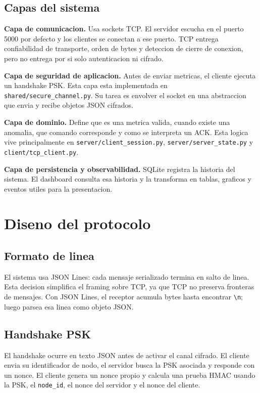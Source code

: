 \documentclass[11pt,letterpaper]{article}
\begin{document}
\subsection{Capas del sistema}

\textbf{Capa de comunicacion.} Usa sockets TCP. El servidor escucha en el puerto
5000 por defecto y los clientes se conectan a ese puerto. TCP entrega
confiabilidad de transporte, orden de bytes y deteccion de cierre de conexion,
pero no entrega por si solo autenticacion ni cifrado.

\textbf{Capa de seguridad de aplicacion.} Antes de enviar metricas, el cliente
ejecuta un handshake PSK. Esta capa esta implementada en
\texttt{shared/secure\_channel.py}. Su tarea es envolver el socket en una
abstraccion que envia y recibe objetos JSON cifrados.

\textbf{Capa de dominio.} Define que es una metrica valida, cuando existe una
anomalia, que comando corresponde y como se interpreta un ACK. Esta logica vive
principalmente en \texttt{server/client\_session.py},
\texttt{server/server\_state.py} y \texttt{client/tcp\_client.py}.

\textbf{Capa de persistencia y observabilidad.} SQLite registra la historia del
sistema. El dashboard consulta esa historia y la transforma en tablas, graficos y
eventos utiles para la presentacion.

\newpage
\section{Diseno del protocolo}

\subsection{Formato de linea}

El sistema usa JSON Lines: cada mensaje serializado termina en salto de linea.
Esta decision simplifica el framing sobre TCP, ya que TCP no preserva fronteras
de mensajes. Con JSON Lines, el receptor acumula bytes hasta encontrar
\texttt{\textbackslash n}; luego parsea esa linea como objeto JSON.

\subsection{Handshake PSK}

El handshake ocurre en texto JSON antes de activar el canal cifrado. El cliente
envia su identificador de nodo, el servidor busca la PSK asociada y responde con
un nonce. El cliente genera un nonce propio y calcula una prueba HMAC usando la
PSK, el \texttt{node\_id}, el nonce del servidor y el nonce del cliente.
\end{document}

